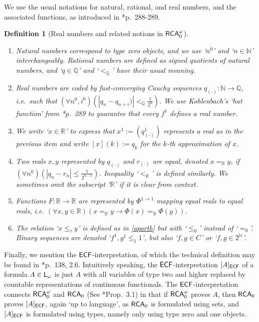 \documentclass[reqno]{amsart}
\newtheorem{defi}[thm]{Definition}
\def\RCA{\textup{\textsf{RCA}}}
\def\RCAo{\textup{\textsf{RCA}}_{0}^{\omega}}
\def\N{{\mathbb  N}}
\def\Q{{\mathbb  Q}}
\def\R{{\mathbb  R}}
\def\L{\textsf{\textup{L}}}
\def\di{\rightarrow}
\def\asa{\leftrightarrow}
\def\ECF{\textup{\textsf{ECF}}}
\numberwithin{equation}{section}
\numberwithin{thm}{section}
\begin{document}
\smallskip

We use the usual notations for natural, rational, and real numbers, and the associated functions, as introduced in \cite{kohlenbach2}*{p.\ 288-289}.  
\begin{defi}[Real numbers and related notions in $\RCAo$]\label{keepintireal}\rm~
\begin{enumerate}
\item Natural numbers correspond to type zero objects, and we use `$n^{0}$' and `$n\in \N$' interchangeably.  Rational numbers are defined as signed quotients of natural numbers, and `$q\in \Q$' and `$<_{\Q}$' have their usual meaning.    
\item Real numbers are coded by fast-converging Cauchy sequences $q_{(\cdot)}:\N\di \Q$, i.e.\  such that $(\forall n^{0}, i^{0})(|q_{n}-q_{n+i})|<_{\Q} \frac{1}{2^{n}})$.  
We use Kohlenbach's `hat function' from \cite{kohlenbach2}*{p.\ 289} to guarantee that every $f^{1}$ defines a real number.  
\item We write `$x\in \R$' to express that $x^{1}:=(q^{1}_{(\cdot)})$ represents a real as in the previous item and write $[x](k):=q_{k}$ for the $k$-th approximation of $x$.    
\item Two reals $x, y$ represented by $q_{(\cdot)}$ and $r_{(\cdot)}$ are \emph{equal}, denoted $x=_{\R}y$, if $(\forall n^{0})(|q_{n}-r_{n}|\leq \frac{1}{2^{n-1}})$. Inequality `$<_{\R}$' is defined similarly.  
We sometimes omit the subscript `$\R$' if it is clear from context.           
\item Functions $F:\R\di \R$ are represented by $\Phi^{1\di 1}$ mapping equal reals to equal reals, i.e. $(\forall x , y\in \R)(x=_{\R}y\di \Phi(x)=_{\R}\Phi(y))$.
\item The relation `$x\leq_{\tau}y$' is defined as in \eqref{aparth} but with `$\leq_{0}$' instead of `$=_{0}$'.  Binary sequences are denoted `$f^{1}, g^{1}\leq_{1}1$', but also `$f,g\in C$' or `$f, g\in 2^{\N}$'.  
\end{enumerate}
\end{defi}
Finally, we mention the $\ECF$-interpretation, of which the technical definition may be found in \cite{troelstra1}*{p.\ 138, 2.6}.
Intuitively speaking, the $\ECF$-interpretation $[A]_{\ECF}$ of a formula $A\in \L_{\omega}$ is just $A$ with all variables 
of type two and higher replaced by countable representations of continuous functionals. 
The $\ECF$-interpretation connects $\RCAo$ and $\RCA_{0}$ (See \cite{kohlenbach2}*{Prop.\ 3.1}) in that if $\RCAo$ proves $A$, then $\RCA_{0}$ proves $[A]_{\ECF}$, again `up to language', as $\RCA_{0}$ is 
formulated using sets, and $[A]_{\ECF}$ is formulated using types, namely only using type zero and one objects.  
\end{document}
